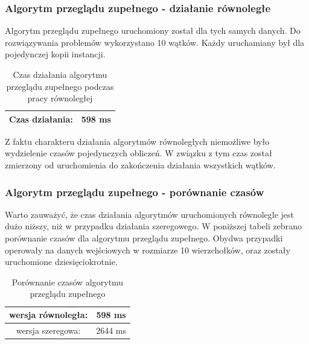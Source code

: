 \documentclass{article}
\begin{document}
		\subsubsection{Algorytm przeglądu zupełnego - działanie równoległe}			
			Algorytm przeglądu zupełnego uruchomiony został dla tych samych danych. Do rozwiązywania problemów wykorzystano 10 wątków. Każdy uruchamiany był dla pojedynczej kopii instancji. \\
			
				\begin{table}[H]
					\centering
					\caption{Czas działania algorytmu przeglądu zupełnego podczas pracy równoległej}
					\begin{tabular}{|c|c|}
						
						\hline Czas działania:   & 598 ms\\ 
					
						\hline 
					\end{tabular} 
				\end{table}
		Z faktu charakteru działania algorytmów równoległych niemożliwe było wydzielenie czasów pojedynczych obliczeń. W związku z tym czas został zmierzony od uruchomienia do zakończenia działania wszystkich wątków.
		\subsubsection{Algorytm przeglądu zupełnego - porównanie czasów}	
			Warto zauważyć, że czas działania algorytmów uruchomionych równolegle jest dużo niższy, niż w przypadku działania szeregowego. W poniższej tabeli zebrano porównanie czasów dla algorytmu przeglądu zupełnego. Obydwa przypadki operowały na danych wejściowych w rozmiarze 10 wierzchołków, oraz zostały uruchomione dziesięciokrotnie.
			
				\begin{table}[H]
					\centering
					\caption{Porównanie czasów algorytmu przeglądu zupełnego}
					\begin{tabular}{|c|c|}
					\hline wersja równoległa:  & 598 ms\\ 	
					\hline wersja szeregowa:  & 2644 ms\\ 
					\hline 
					\end{tabular} 
				\end{table}	
				
\end{document}
